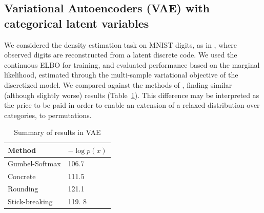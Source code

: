 \documentclass[twoside]{article}
\begin{document}
\subsection*{Variational Autoencoders (VAE) with categorical latent variables}
We considered the density estimation task on MNIST digits, as in
\cite{maddison2016concrete, jang2016categorical}, where observed
digits are reconstructed from a latent discrete code. We used the
continuous ELBO for training, and evaluated performance based on the
marginal likelihood, estimated through the multi-sample variational
objective of the discretized model. We compared against the methods of
\cite{jang2016categorical, maddison2016concrete}, finding similar
(although slightly worse) results (Table~\ref{tab:vae}). This difference may be
interpreted as the price to be paid in order to enable an extension of
a relaxed distribution over categories, to permutations.

\begin{table}[h]
  \caption{Summary of results in VAE}
  \label{tab:vae}
  \centering
  \begin{tabular}{ll}
    \textbf{Method} & $- \log p(x)$ \\
    \hline
    Gumbel-Softmax    & 106.7 \\
    Concrete  &  111.5\\
    Rounding &  121.1 \\
    Stick-breaking & 119. 8\\
    \bottomrule
  \end{tabular}
\end{table}


   
\end{document}
